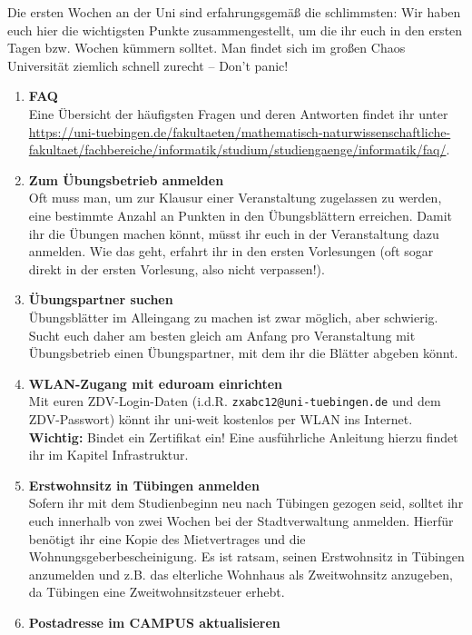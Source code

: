 
Die ersten Wochen an der Uni sind erfahrungsgemäß die schlimmsten: Wir haben euch hier die wichtigsten Punkte zusammengestellt, um die ihr euch in den ersten Tagen bzw. Wochen kümmern solltet. Man findet sich im großen Chaos Universität ziemlich schnell zurecht -- Don't panic!
  
  \begin{enumerate}[label=$\bigcirc$]
  	
  	\item \textbf{FAQ} \\
		Eine Übersicht der häufigsten Fragen und deren Antworten findet ihr unter \url{https://uni-tuebingen.de/fakultaeten/mathematisch-naturwissenschaftliche-fakultaet/fachbereiche/informatik/studium/studiengaenge/informatik/faq/}.
	\item \textbf{Zum Übungsbetrieb anmelden} \\
	  	Oft muss man, um zur Klausur einer Veranstaltung zugelassen zu werden, eine bestimmte Anzahl an Punkten in den Übungsblättern erreichen. Damit ihr die Übungen machen könnt, müsst ihr euch in der Veranstaltung dazu anmelden. Wie das geht, erfahrt ihr in den ersten Vorlesungen (oft sogar direkt in der ersten Vorlesung, also nicht verpassen!).
  	\item \textbf{Übungspartner suchen} \\
	  	Übungsblätter im Alleingang zu machen ist zwar möglich, aber schwierig. Sucht euch daher am besten gleich am Anfang pro Veranstaltung mit Übungsbetrieb einen Übungspartner, mit dem ihr die Blätter abgeben könnt.
  	\item \textbf{WLAN-Zugang mit eduroam einrichten}\\
	  	Mit euren ZDV-Login-Daten (i.d.R. \texttt{zxabc12@uni-tuebingen.de} und dem ZDV-Passwort) könnt ihr uni-weit kostenlos per WLAN ins Internet. \textbf{Wichtig:} Bindet ein Zertifikat ein! Eine ausführliche Anleitung hierzu findet ihr im Kapitel Infrastruktur.
  	\item \textbf{Erstwohnsitz in Tübingen anmelden} \\
	  	Sofern ihr mit dem Studienbeginn neu nach Tübingen gezogen seid, solltet ihr euch innerhalb von zwei Wochen bei der Stadtverwaltung anmelden. Hierfür benötigt ihr eine Kopie des Mietvertrages und die Wohnungsgeberbescheinigung. Es ist ratsam, seinen Erstwohnsitz in Tübingen anzumelden und z.B. das elterliche Wohnhaus als Zweitwohnsitz anzugeben, da Tübingen eine Zweitwohnsitzsteuer erhebt.
	\item \textbf{Postadresse im CAMPUS aktualisieren}\\

\end{enumerate}
